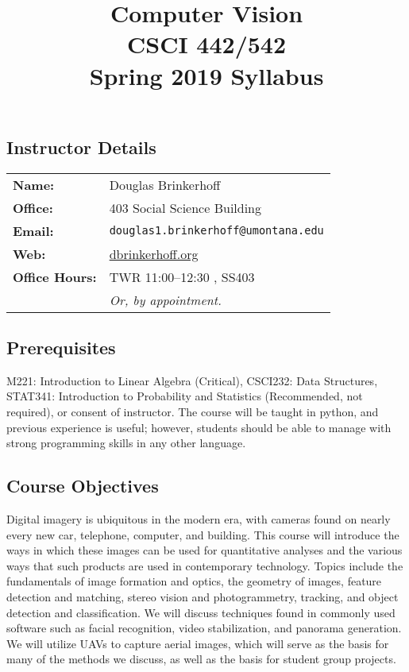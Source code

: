 \documentclass[12pt,letterpaper]{scrartcl}
\title{Computer Vision\\
CSCI 442/542\\
Spring 2019 Syllabus}
\date{}
\begin{document}
\maketitle

\subsection*{Instructor Details}
\begin{tabular}{l l}
\textbf{Name:} & Douglas Brinkerhoff\\
\textbf{Office:} & 403 Social Science Building\\
\textbf{Email:} & \texttt{douglas1.brinkerhoff@umontana.edu}\\
\textbf{Web: } &
  \href{dbrinkerhoff.org}{dbrinkerhoff.org}\\
\textbf{Office Hours:} & TWR 11:00--12:30 , SS403\\
& \textit{Or, by appointment.}
\end{tabular}

\subsection*{Prerequisites}
M221: Introduction to Linear Algebra (Critical), CSCI232: Data Structures, STAT341: Introduction to Probability and Statistics (Recommended, not required), or consent of instructor.  The course will be taught in python, and previous experience is useful; however, students should be able to manage with strong programming skills in any other language.  
\subsection*{Course Objectives}
Digital imagery is ubiquitous in the modern era, with cameras found on nearly every new car, telephone, computer, and building.  This course will introduce the ways in which these images can be used for quantitative analyses and the various ways that such products are used in contemporary technology.  Topics include the fundamentals of image formation and optics, the geometry of images, feature detection and matching, stereo vision and photogrammetry, tracking, and object detection and classification.  We will discuss techniques found in commonly used software such as facial recognition, video stabilization, and panorama generation.  We will utilize UAVs to capture aerial images, which will serve as the basis for many of the methods we discuss, as well as the basis for student group projects.  
\end{document}
